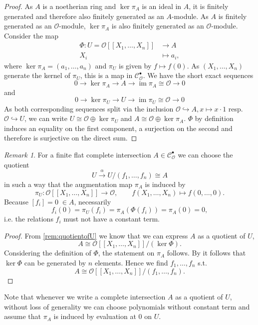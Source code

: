 \documentclass{article}
\theoremstyle{plain}%
\theoremstyle{definition}
\theoremstyle{remark}
\newtheorem{remark}[theorem]{Remark}
\newcommand{\cob}{\mathcal{C}_\mathcal{O}^\bullet}
\newcommand{\im}{\operatorname{im}}
\begin{document}
\begin{proof}
    As \(A\) is a noetherian ring and \(\ker \pi_A\) is an ideal in \(A\), it is finitely generated 
    and therefore also finitely generated as an \(A\)-module.
    As \(A\) is finitely generated as an \(\mathcal{O}\)-module, \(\ker \pi_A\) is also
    finitely generated as an \(\mathcal{O}\)-module. Consider the map
    \begin{align*}
        \Phi\colon U = \mathcal{O}[[X_1, \dots, X_n]] &\to A\\
        X_i &\mapsto a_i,
    \end{align*}
    where \(\ker \pi_A = (a_1, \dots, a_n)\) and \(\pi_U\) is given by \(f \mapsto f(0)\). 
    As \((X_1, \dots, X_n)\) generate the kernel of \(\pi_U\), this is a map in \(\cob\).
    We have the short exact sequences
    \[
        0 \to \ker \pi_A \to A \to \im \pi_A \cong \mathcal{O} \to 0
    \]
    and
    \[
        0 \to \ker \pi_U \to U \to \im \pi_U \cong \mathcal{O} \to 0
    \]
    As both corresponding sequences split via the inclusion \(\mathcal{O} \hookrightarrow A, x \mapsto x \cdot 1\)
    resp. \(\mathcal{O} \hookrightarrow U\), we can write \(U \cong \mathcal{O} \oplus \ker \pi_U\) and
    \(A \cong \mathcal{O} \oplus \ker \pi_A\).
    \(\Phi\) by definition induces an equality on the first component, 
    a surjection on the second and therefore is surjective on the direct sum.
\end{proof}

\begin{remark}\label{rem:noconstant}
    For a finite flat complete intersection \(A \in \cob\) we can choose the quotient
    \[
        U \xrightarrow{\alpha} U/(f_1, \dots, f_n) \cong A  
    \]
    in such a way that the augmentation map \(\pi_A\) is induced by 
    \[
        \pi_U\colon \mathcal{O}[[X_1, \dots, X_n]] \to \mathcal{O},\qquad f(X_1, \dots, X_n) \mapsto f(0,\dots, 0).  
    \]
    Because \([f_i] = 0 \; \in A\), necessarily
    \[
        f_i(0) = \pi_U(f_i) = \pi_A(\Phi(f_i)) = \pi_A(0) = 0,  
    \]
    i.e. the relations \(f_i\) must not have a constant term.
\end{remark}
\begin{proof}
    From \cref{rem:quotientofU} we know that we can express \(A\) as a quotient of \(U\),
    \[
        A \cong \mathcal{O}[[X_1, \dots, X_n]]/(\ker \Phi).
    \]
    Considering the definition of \(\Phi\), the statement on \(\pi_A\) follows.
    By \cite[theorem 21.2]{Matsumura1986} it follows that \(\ker \Phi\) can be generated by \(n\) elements.
    Hence we find \(f_1, \dots, f_n\) s.t.
    \[
        A \cong \mathcal{O}[[X_1, \dots, X_n]]/(f_1, \dots, f_n).
    \]
\end{proof}
Note that whenever we write a complete intersection \(A\) as a quotient of \(U\), without loss of generality
we can choose polynomials without constant term and assume that \(\pi_A\) is induced by evaluation at 0 on \(U\).
\end{document}
